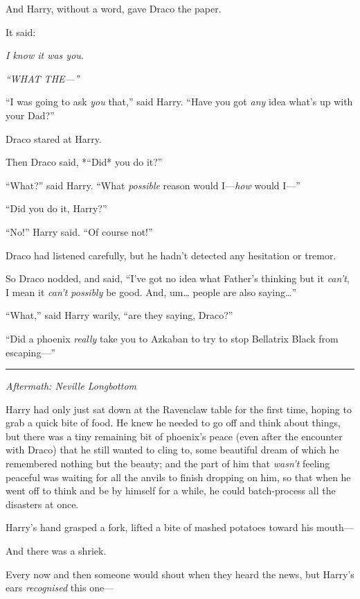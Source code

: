 And Harry, without a word, gave Draco the paper.

It said:

\emph{I know it was you.}

\emph{``WHAT THE---''}

``I was going to ask \emph{you} that,'' said Harry. ``Have you got
\emph{any} idea what's up with your Dad?''

Draco stared at Harry.

Then Draco said, *``Did* you do it?''

``What?'' said Harry. ``What \emph{possible} reason would I---\emph{how}
would I---''

``Did you do it, Harry?''

``No!'' Harry said. ``Of course not!''

Draco had listened carefully, but he hadn't detected any hesitation or
tremor.

So Draco nodded, and said, ``I've got no idea what Father's thinking but
it \emph{can't}, I mean it \emph{can't possibly} be good. And,
um\ldots{} people are also saying\ldots{}''

``What,'' said Harry warily, ``are they saying, Draco?''

``Did a phoenix \emph{really} take you to Azkaban to try to stop
Bellatrix Black from escaping---''

\begin{center}\rule{3in}{0.4pt}\end{center}

\emph{Aftermath: Neville Longbottom}

Harry had only just sat down at the Ravenclaw table for the first time,
hoping to grab a quick bite of food. He knew he needed to go off and
think about things, but there was a tiny remaining bit of phoenix's
peace (even after the encounter with Draco) that he still wanted to
cling to, some beautiful dream of which he remembered nothing but the
beauty; and the part of him that \emph{wasn't} feeling peaceful was
waiting for all the anvils to finish dropping on him, so that when he
went off to think and be by himself for a while, he could batch-process
all the disasters at once.

Harry's hand grasped a fork, lifted a bite of mashed potatoes toward his
mouth---

And there was a shriek.

Every now and then someone would shout when they heard the news, but
Harry's ears \emph{recognised} this one---

